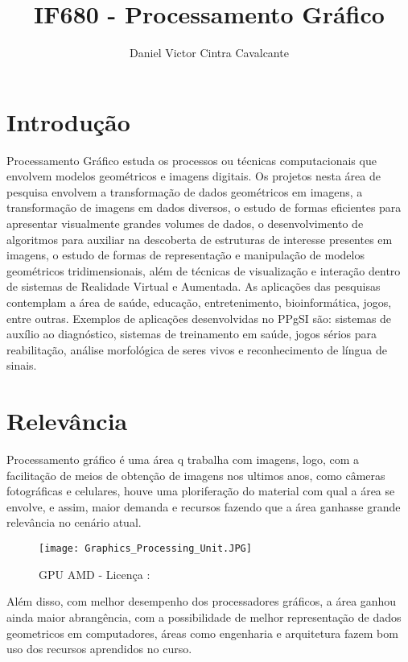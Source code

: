 \documentclass[10pt,a4paper]{article}
\title{IF680 - Processamento Gráfico}
\author{Daniel Victor Cintra Cavalcante}
\begin{document}
\maketitle

\section{Introdução}
Processamento Gráfico estuda os processos ou técnicas computacionais que envolvem modelos geométricos e imagens digitais. Os projetos nesta área de pesquisa envolvem a transformação de dados geométricos em imagens, a transformação de imagens em dados diversos, o estudo de formas eficientes para apresentar visualmente grandes volumes de dados, o desenvolvimento de algoritmos para auxiliar na descoberta de estruturas de interesse presentes em imagens, o estudo de formas de representação e manipulação de modelos geométricos tridimensionais, além de técnicas de visualização e interação dentro de sistemas de Realidade Virtual e Aumentada. As aplicações das pesquisas contemplam a área de saúde, educação, entretenimento, bioinformática, jogos, entre outras. Exemplos de aplicações desenvolvidas no PPgSI são: sistemas de auxílio ao diagnóstico, sistemas de treinamento em saúde, jogos sérios para reabilitação, análise morfológica de seres vivos e reconhecimento de língua de sinais.



\section{Relevância}
Processamento gráfico é uma área q trabalha com imagens, logo, com a facilitação de meios de obtenção de imagens nos ultimos anos, como câmeras fotográficas e celulares, houve uma ploriferação do material com qual a área se envolve, e assim, maior demanda e recursos fazendo que a área ganhasse grande relevância no cenário atual.\newline
\begin{figure}[h!]
    \centering
    \texttt{[image: Graphics\_Processing\_Unit.JPG]}
    \caption{GPU AMD - Licença : \cite{img}}
    \label{fig:universe}
    \end{figure}
\newline
Além disso, com melhor desempenho dos processadores gráficos, a área ganhou ainda maior abrangência, com a possibilidade de melhor representação de dados geometricos em computadores, áreas como engenharia e arquitetura fazem bom uso dos recursos aprendidos no curso.
\newpage
\end{document}
